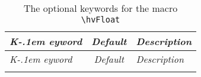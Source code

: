 \documentclass[twoside,paper=a4,usegeometry]{scrartcl}
\def\nxLcs#1{\texttt{\textbackslash#1}}
\begin{document}
\begingroup
\small
  \def\rowvsp{\rule{0pt}{9pt}}%
  \def\rowhsp{\hspace*{\normalparindent}}%
  \def\rownl{\newline\rowhsp}%
  \def\none{{\itshape none}}%
  \def\arraystretch{0.96}%
\begin{xltabular}{\textwidth}{@{} l>{\small\ttfamily}cX @{}}
\caption{The optional keywords for the macro \nxLcs{hvFloat}}\label{tab:options}\\\toprule
\emph{K\kern-.1em eyword} & \rmfamily\emph{Default} & \emph{Description}\\\midrule
\endfirsthead
\midrule
\emph{K\kern-.1em eyword} & \rmfamily\emph{Default} & \emph{Description}\\\midrule
\endhead
\midrule
\endfoot
\bottomrule
\endlastfoot


\end{xltabular}
\end{document}
